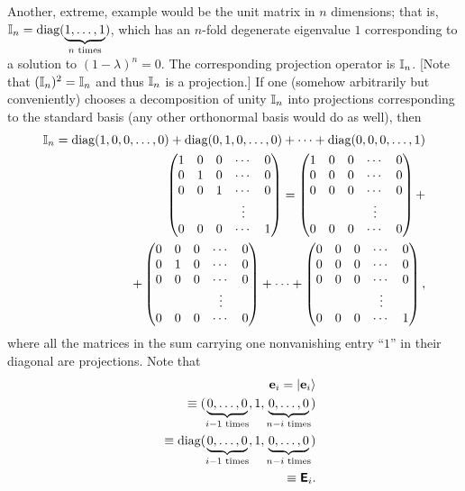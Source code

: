 {Another, extreme, example would be the unit matrix in $n$ dimensions; that is,
${\Bbb I}_n=\textrm{diag}(\underbrace{1,\ldots ,1}_{n \textrm{ times}})$,
which has an $n$-fold degenerate eigenvalue $1$ corresponding to a solution to
$(1-\lambda )^n=0$.
The corresponding projection operator is ${\Bbb I}_n$.  [Note that $({\Bbb I}_n)^2 ={\Bbb I}_n$
and thus ${\Bbb I}_n$ is a projection.]
If one (somehow arbitrarily but conveniently) chooses a decomposition of unity ${\Bbb I}_n$
into projections corresponding to the standard basis (any other orthonormal basis would do as well),
then
\begin{equation}
\begin{split}
{\Bbb I}_n = \textrm{diag}( 1,0,0,\ldots ,0 )
+   \textrm{diag}( 0,1,0,\ldots ,0 )
+ \cdots
+   \textrm{diag}( 0,0,0,\ldots ,1 )\\
\begin{pmatrix}
 1&0&0&\cdots &0\\
 0&1&0&\cdots &0\\
 0&0&1&\cdots &0\\
&&&\vdots&\\
 0&0&0&\cdots &1
\end{pmatrix}  =
\begin{pmatrix}
 1&0&0&\cdots &0\\
 0&0&0&\cdots &0\\
 0&0&0&\cdots &0\\
&&&\vdots&\\
 0&0&0&\cdots &0
\end{pmatrix}  +
\\
\quad
+%
\begin{pmatrix}
 0&0&0&\cdots &0\\
 0&1&0&\cdots &0\\
 0&0&0&\cdots &0\\
&&&\vdots&\\
 0&0&0&\cdots &0
\end{pmatrix} +\cdots
+%
\begin{pmatrix}
 0&0&0&\cdots &0\\
 0&0&0&\cdots &0\\
 0&0&0&\cdots &0\\
&&&\vdots&\\
 0&0&0&\cdots &1
\end{pmatrix}
,
\end{split}
\end{equation}
where all the matrices in the sum carrying one nonvanishing entry ``$1$''
in their diagonal are  projections.
Note that
\begin{equation}
\begin{split}
{\bf e}_i=\vert {\bf e}_i \rangle  \\
\quad \equiv ( \underbrace{0,\ldots , 0}_{i-1 \textrm{ times}}, 1, \underbrace{0,\ldots , 0}_{n-i \textrm{ times}} )   \\
\quad \equiv  \textrm{diag}(  \underbrace{0,\ldots , 0}_{i-1 \textrm{ times}}, 1, \underbrace{0,\ldots , 0}_{n-i \textrm{ times}}  )
  \\
\quad \equiv  \textsf{\textbf{E}}_{i}.
\end{split}
\end{equation}
{\textrm{\eexample}}
}


